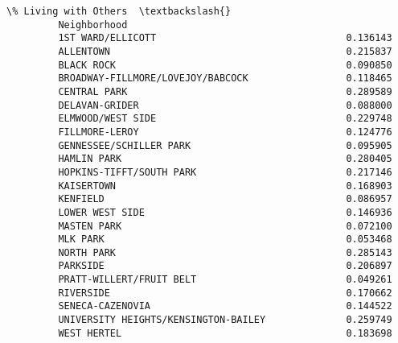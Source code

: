 \documentclass[11pt]{article}
\begin{document}
\begin{Verbatim}[commandchars=\\\{\}]
                                               \% Living with Others  \textbackslash{}
         Neighborhood                                                 
         1ST WARD/ELLICOTT                                 0.136143   
         ALLENTOWN                                         0.215837   
         BLACK ROCK                                        0.090850   
         BROADWAY-FILLMORE/LOVEJOY/BABCOCK                 0.118465   
         CENTRAL PARK                                      0.289589   
         DELAVAN-GRIDER                                    0.088000   
         ELMWOOD/WEST SIDE                                 0.229748   
         FILLMORE-LEROY                                    0.124776   
         GENNESSEE/SCHILLER PARK                           0.095905   
         HAMLIN PARK                                       0.280405   
         HOPKINS-TIFFT/SOUTH PARK                          0.217146   
         KAISERTOWN                                        0.168903   
         KENFIELD                                          0.086957   
         LOWER WEST SIDE                                   0.146936   
         MASTEN PARK                                       0.072100   
         MLK PARK                                          0.053468   
         NORTH PARK                                        0.285143   
         PARKSIDE                                          0.206897   
         PRATT-WILLERT/FRUIT BELT                          0.049261   
         RIVERSIDE                                         0.170662   
         SENECA-CAZENOVIA                                  0.144522   
         UNIVERSITY HEIGHTS/KENSINGTON-BAILEY              0.259749   
         WEST HERTEL                                       0.183698   
         

\end{Verbatim}
\end{document}
